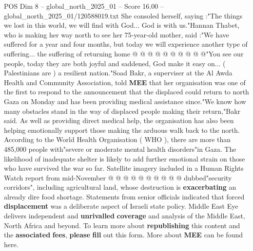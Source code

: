 \begin{textsample}{POS Dim 8 – global\_north\_2025\_01 – Score 16.00 – global\_north\_2025\_01/120588019.txt}
She consoled herself, saying :"The things we lost in this world, we will find with God...
God is with us."Hannan Thabet, who is making her way north to see her 75-year-old mother, said :"We have suffered for a year and four months, but today we will experience another type of suffering... the suffering of returning home @ @ @ @ @ @ @ @ @ @"You see our people, today they are both joyful and saddened, God make it easy on... ( Palestinians are ) a resilient nation."Soad Bakr, a superviser at the Al Awda Health and Community Association, told \textbf{MEE} that her organisation was one of the first to respond to the announcement that the displaced could return to north Gaza on Monday and has been providing medical assistance since."We know how many obstacles stand in the way of displaced people making their return,"Bakr said.
As well as providing direct medical help, the organisation has also been helping emotionally support those making the arduous walk back to the north.
According to the World Health Organisation ( WHO ), there are more than 485,000 people with"severe or moderate mental health disorders"in Gaza.
The likelihood of inadequate shelter is likely to add further emotional strain on those who have survived the war so far.
Satellite imagery included in a Human Rights Watch report from mid-November @ @ @ @ @ @ @ @ @ @ dubbed"security corridors", including agricultural land, whose destruction is \textbf{exacerbating} an already dire food shortage.
Statements from senior officials indicated that forced \textbf{displacement} was a deliberate aspect of Israeli state policy.
Middle East Eye delivers independent and \textbf{unrivalled} \textbf{coverage} and analysis of the Middle East, North Africa and beyond.
To learn more about \textbf{republishing} this content and the \textbf{associated} \textbf{fees}, \textbf{please} \textbf{fill} out this form.
More about \textbf{MEE} can be found here.

\end{textsample}
